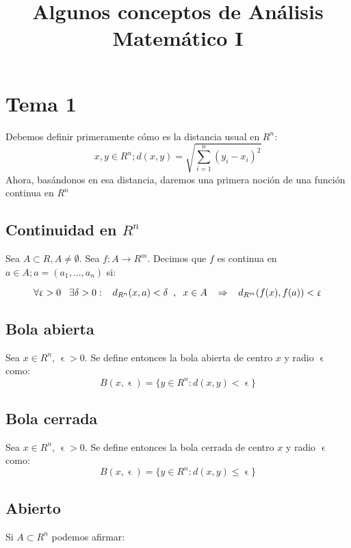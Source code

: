 \documentclass[11pt]{article}
\title{\textbf{Algunos conceptos de Análisis Matemático I}}
\date{}
\begin{document}
\maketitle



\section*{Tema 1}

Debemos definir primeramente cómo es la distancia usual en $R^n$:
\[
x,y \in R^n ; d(x,y) = \sqrt{\sum_{i=1}^n (y_i - x_i)^2}
\]
Ahora, basándonos en esa distancia, daremos una primera noción de una función continua en $R^n$


\subsection*{Continuidad en $R^n$}
Sea $A \subset R, A \neq \emptyset$. Sea $f: A \to R^m$. Decimos que $f$ es continua en $a \in A; a = (a_1,...,a_n)$ si:

\[
\forall \upvarepsilon > 0  \hspace{0.3cm}\exists \delta > 0 :\hspace{0.3cm} d_{R^n}(x,a)< \delta \hspace{0.2cm} ,\hspace{0.2cm} x \in A\hspace{0.3cm} \Rightarrow \hspace{0.3cm} d_{R^m}(f(x),f(a))< \upvarepsilon
\]


\subsection*{Bola abierta}

Sea $x\in R^n$, $\upvarepsilon > 0$. Se define entonces la bola abierta de centro $x$ y radio $\upvarepsilon$ como:
\[
B(x,\upvarepsilon) = \{ y \in R^n : d(x,y) < \upvarepsilon\}
\]



\subsection*{Bola cerrada}

Sea $x\in R^n$, $\upvarepsilon > 0$. Se define entonces la bola cerrada de centro $x$ y radio $\upvarepsilon$ como:
\[
B(x,\upvarepsilon) = \{ y \in R^n : d(x,y) \leq \upvarepsilon\}
\]



\subsection*{Abierto}
Si $A\subset R^n$ podemos afirmar:
\end{document}
